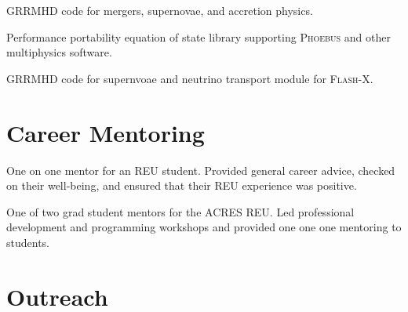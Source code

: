 \documentclass[letterpaper]{deedy-resume} %
\begin{document}
GRRMHD code for mergers, supernovae, and accretion physics.
\sectionspace %

Performance portability equation of state library supporting \textsc{Phoebus} and other multiphysics software.
\sectionspace %

GRRMHD code for supernvoae and neutrino transport module for \textsc{Flash-X}.
\sectionspace %




\section{Career Mentoring}


One on one mentor for an REU student. Provided general career advice, checked on their well-being, and ensured that their REU experience was positive.
\sectionspace %



One of two grad student mentors for the ACRES REU. Led professional development and programming workshops and provided one one one mentoring to students.
\sectionspace %





\section{Outreach}
\end{document}
